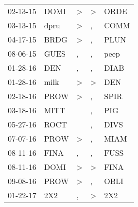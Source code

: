 \begin{supertabular}{p{0.07\textwidth}p{0.06\textwidth}p{0.02\textwidth}p{0.02\textwidth}p{0.06\textwidth}}
          02-13-15\textsuperscript{} &           DOMI\textsuperscript{} &     \textgreater &     \textgreater &           ORDE\textsuperscript{} \\
          03-13-15\textsuperscript{} &           dpru\textsuperscript{} &     \textgreater &                , &           COMM\textsuperscript{} \\
          04-17-15\textsuperscript{} &           BRDG\textsuperscript{} &     \textgreater &                , &           PLUN\textsuperscript{} \\
          08-06-15\textsuperscript{} &           GUES\textsuperscript{} &                , &                , &           peep\textsuperscript{} \\
          01-28-16\textsuperscript{} &            DEN\textsuperscript{} &                , &                , &           DIAB\textsuperscript{} \\
          01-28-16\textsuperscript{} &           milk\textsuperscript{} &     \textgreater &     \textgreater &            DEN\textsuperscript{} \\
          02-18-16\textsuperscript{} &           PROW\textsuperscript{} &     \textgreater &                , &           SPIR\textsuperscript{} \\
          03-18-16\textsuperscript{} &           MITT\textsuperscript{} &                  &                , &            PIG\textsuperscript{} \\
          05-27-16\textsuperscript{} &           ROCT\textsuperscript{} &                  &                , &           DIVS\textsuperscript{} \\
          07-07-16\textsuperscript{} &           PROW\textsuperscript{} &     \textgreater &                , &           MIAM\textsuperscript{} \\
          08-11-16\textsuperscript{} &           FINA\textsuperscript{} &                , &                , &           FUSS\textsuperscript{} \\
          08-11-16\textsuperscript{} &           DOMI\textsuperscript{} &     \textgreater &     \textgreater &           FINA\textsuperscript{} \\
          09-08-16\textsuperscript{} &           PROW\textsuperscript{} &     \textgreater &                , &           OBLI\textsuperscript{} \\
          01-22-17\textsuperscript{} &            2X2\textsuperscript{} &                , &     \textgreater &            2X2\textsuperscript{} \\

\end{supertabular}
